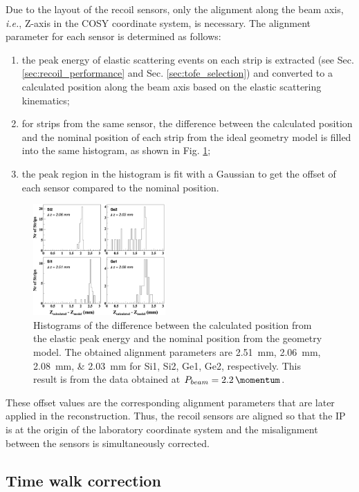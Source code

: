 \documentclass[number,5p]{elsarticle}
\begin{document}
Due to the layout of the recoil sensors, only the alignment along
the beam axis, \textit{i.e.}, Z-axis in the COSY coordinate system, is necessary.
The alignment parameter for each sensor is determined as follows:
\begin{enumerate}
\item the peak energy of elastic scattering events on each strip is extracted
  (see Sec. \ref{sec:recoil_performance} and Sec. \ref{sec:tofe_selection}) and converted to a calculated position along the beam axis based on the elastic
  scattering kinematics;
\item for strips from the same sensor, the difference between the calculated
  position and the nominal position of each strip from the ideal geometry model is filled into the same histogram, as shown in Fig. \ref{fig:alignment};
\item the peak region in the histogram is fit with a Gaussian to get the offset
  of each sensor compared to the nominal position.
\end{enumerate}
\begin{figure}[th!]
  \centering
  \includegraphics[width=0.45\textwidth]{./alignment.png}
  \caption{Histograms of the difference between the calculated position from the
    elastic peak energy and the nominal position from the geometry model.
    The obtained alignment parameters are
    \SIlist[list-units=single]{2.51;2.06;2.08;2.03}{\mm} for Si1, Si2, Ge1, Ge2, respectively.
    This result is from the data obtained at $P_{beam} =
    \SI{2.2}{\momentum}$.}
  \label{fig:alignment}
\end{figure}
These offset values are the corresponding alignment parameters that are later applied in the reconstruction.
Thus, the recoil sensors are aligned so that the IP is at the origin of the
laboratory coordinate system and the misalignment between the sensors is
simultaneously corrected.

\subsection{Time walk correction}
\label{sec:timewalk}
\end{document}
